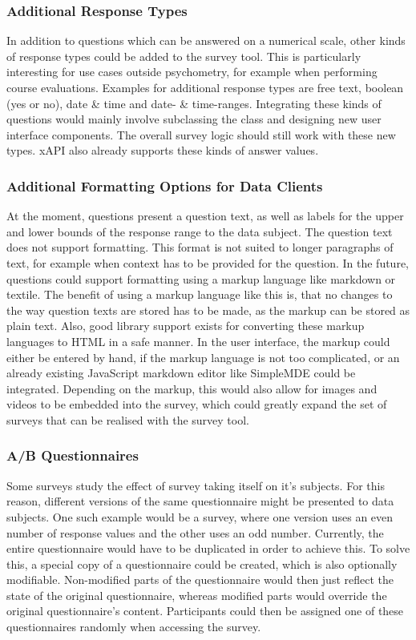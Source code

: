 		\subsubsection{Additional Response Types}
			In addition to questions which can be answered on a numerical
			scale, other kinds of response types could be added to the survey
			tool. This is particularly interesting for use cases outside
			psychometry, for example when performing course evaluations.
			Examples for additional response types are free text,
			boolean (yes or no), date \& time and date- \& time-ranges.
			Integrating these kinds of questions would mainly involve
			subclassing the  class and designing
			new user interface components. The overall survey logic
			should still work with these new types. xAPI also already
			supports these kinds of answer values.

		\subsubsection{Additional Formatting Options for Data Clients}
			At the moment, questions present a question text, as
			well as labels for the upper and lower bounds of the response
			range to the data subject. The question text does not
			support formatting. This format is not suited to
			longer paragraphs of text, for example when context has
			to be provided for the question. In the future, questions
			could support formatting using a markup language
			like markdown or textile. The benefit of using a markup
			language like this is, that no changes to the way
			question texts are stored has to be made, as the markup
			can be stored as plain text. Also, good library support
			exists for converting these markup languages to HTML
			in a safe manner. In the user interface, the markup
			could either be entered by hand, if the markup language
			is not too complicated, or an already existing
			JavaScript markdown editor like SimpleMDE could be integrated.
			Depending on the markup, this would also allow for images
			and videos to be embedded into the survey, which
			could greatly expand the set of surveys that can
			be realised with the survey tool.

		\subsubsection{A/B Questionnaires}
			Some surveys study the effect of survey taking itself
			on it's subjects. For this reason, different versions
			of the same questionnaire might be presented to
			data subjects. One such example would be a survey,
			where one version uses an even number of response
			values and the other uses an odd number. Currently,
			the entire questionnaire would have to be duplicated in
			order to achieve this. To solve this, a special
			copy of a questionnaire could be created, which is
			also optionally modifiable. Non-modified parts
			of the questionnaire would then just reflect the
			state of the original questionnaire, whereas modified
			parts would override the original questionnaire's content.
			Participants could then be assigned one of these
			questionnaires randomly when accessing the survey.


